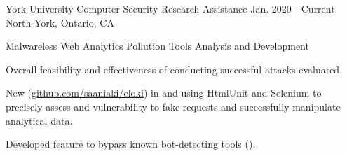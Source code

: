 

\begin{cventries}

  \cventry
    {York University} %
    {Computer Security Research Assistance} %
    {Jan. 2020 - Current} %
    {North York, Ontario, CA} %
    {
      \begin{cvitems} %
        \item {Malwareless Web Analytics Pollution Tools Analysis and Development}
          \begin{cvsubitems}
            \item {Overall feasibility and effectiveness of conducting successful attacks evaluated.}
            \item {New  (\underline{\href{https://github.com/saaniaki/eloki}{github.com/saaniaki/eloki}}) in  and  using HtmlUnit and Selenium to precisely assess  and  vulnerability to fake requests and successfully manipulate analytical data.}
            \item {Developed feature to bypass known bot-detecting tools ().}
          \end{cvsubitems}
      \end{cvitems}
    }


\end{cventries}

